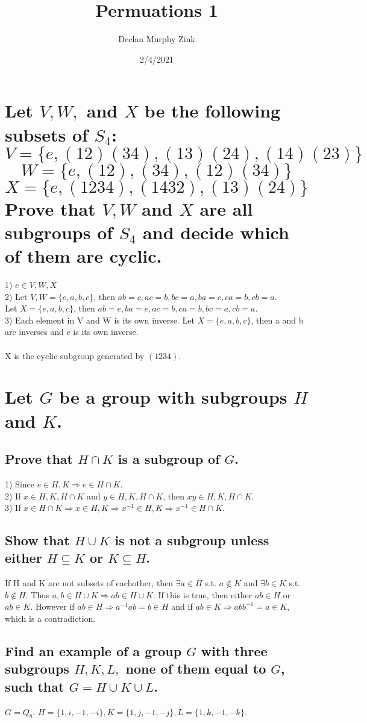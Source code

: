 \documentclass[12pt]{article}
\begin{document}
\title{Permuations 1}
\author{Declan Murphy Zink}
\date{2/4/2021}
\maketitle

\setcounter{section}{1}

\section{
    Let $V, W,$ and $X$ be the following subsets of $S_4$:\\
    $$ V = \{e, (12)(34), (13)(24), (14)(23)\}$$
    $$ W = \{e, (12), (34),(12)(34)\}$$
    $$ X = \{e, (1234),(1432),(13)(24)\}$$
    Prove that $V, W$ and $X$ are all subgroups of $S_4$ and decide which of them are cyclic.
}
1) $e \in V, W, X$\\
2) Let $V,W = \{e,a,b,c\}$, then $ab = c, ac = b, bc = a, ba = c, ca = b, cb = a$.\\
Let $X = \{e,a,b,c\}$, then $ab = e, ba = e, ac = b, ca = b, bc = a, cb = a$.\\
3) Each element in V and W is its own inverse. Let $X = \{e,a,b,c\}$, then a and b are inverses and c is its own inverse.\\\\
X is the cyclic subgroup generated by $(1234)$.

\setcounter{section}{4}

\section{Let $G$ be a group with subgroups $H$ and $K$.}
\subsection{Prove that $H \cap K$ is a subgroup of $G$.}
1) Since $e \in H, K \Rightarrow e \in H \cap K$.\\
2) If $x \in H, K, H \cap K$ and $y \in H, K, H \cap K$, then $xy \in H, K, H \cap K$.\\
3) If $x \in H \cap K \Rightarrow x \in H, K \Rightarrow x^{-1} \in H, K \Rightarrow x^{-1} \in H \cap K$.

\subsection{Show that $H \cup K$ is not a subgroup unless either $H \subseteq K$ or $K \subseteq H$.}
If H and K are not subsets of eachother, then $\exists a \in H$ s.t. $a \notin K$ and $\exists b \in K$ s.t. $b \notin H$. Thus $a,b \in H \cup K \Rightarrow ab \in H \cup K$. If this is true, then either $ab \in H$ or $ab \in K$. However if $ab \in H \Rightarrow a^{-1}ab = b \in H$ and if $ab \in K \Rightarrow abb^{-1} = a \in K$, which is a contradiction.

\subsection{Find an example of a group $G$ with three subgroups $H, K, L,$ none of them equal to $G$, such that $G = H \cup K \cup L$.}
$G = Q_8$. $H = \{1,i,-1,-i\}, K = \{1,j,-1,-j\}, L = \{1,k,-1,-k\}$. 
\end{document}
